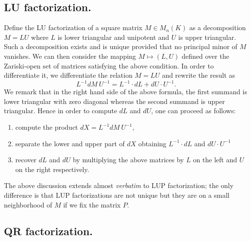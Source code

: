 \documentclass{sig-alternate}
\begin{document}
{\subsection*{LU factorization.}

Define the LU factorization of a square matrix $M \in M_n(K)$ as a decomposition $M = LU$ 
where $L$ is lower triangular and unipotent and $U$ is upper triangular. 
Such a decomposition exists and is unique provided that no principal minor
of $M$ vanishes. We can then consider the mapping $M \mapsto (L,U)$ 
defined over the Zariski-open set of matrices satisfying the above 
condition. In order to differentiate it, we differentiate the relation 
$M = LU$ and rewrite the result as
$$L^{-1} dM \: U^{-1} = L^{-1} \cdot dL + dU \cdot U^{-1}.$$
We remark that in the right hand side of the above formula, the first
summand is lower triangular with zero diagonal whereas 
the second summand is upper triangular. Hence in order to compute $dL$
and $dU$, one can proceed as follows: 
\begin{enumerate}
\item compute the product $dX = L^{-1} dM \: U^{-1}$,
\item separate the lower and upper part of $dX$ obtaining $L^{-1} \cdot dL$ and $dU \cdot U^{-1}$
\item recover $dL$ and $dU$ by multiplying the above matrices by $L$ on the left and $U$ on the right respectively.
\end{enumerate}
The above discussion extends almost \emph{verbatim} to LUP 
factorization; the only difference is that LUP factorizations are not 
unique but they are on a small neighborhood of $M$ if we fix the matrix 
$P$.

\subsection*{QR factorization.}

}
\end{document}
